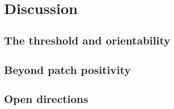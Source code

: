 \section{Discussion}
\label{sec:discussion}

\subsection{The threshold and orientability}

\subsection{Beyond patch positivity}

\subsection{Open directions}
